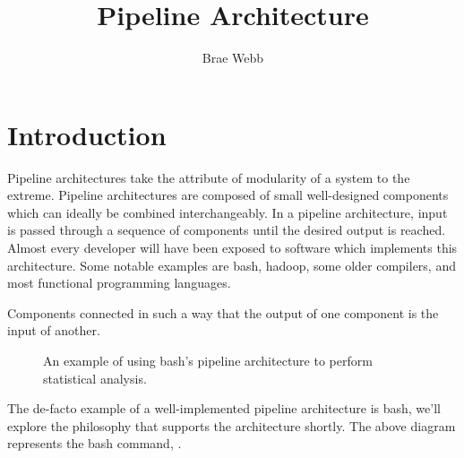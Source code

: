 \title{Pipeline Architecture}
\author{Brae Webb}
\date{}

\maketitle

\section{Introduction}

Pipeline architectures take the attribute of modularity of a system to the extreme.
Pipeline architectures are composed of small well-designed components which can ideally be combined interchangeably.
In a pipeline architecture, input is passed through a sequence of components until the desired output is reached.
Almost every developer will have been exposed to software which implements this architecture.
Some notable examples are bash, hadoop, some older compilers, and most functional programming languages.

\begin{definition}
    Components connected in such a way that the output of one component is the input of another.
\end{definition}


\begin{figure}[ht]
    \centering
{}
\caption{An example of using bash's pipeline architecture to perform statistical analysis.}
\label{fig:bash-example}
\end{figure}

The de-facto example of a well-implemented pipeline architecture is bash,
we'll explore the philosophy that supports the architecture shortly.
The above diagram represents the bash command, .

